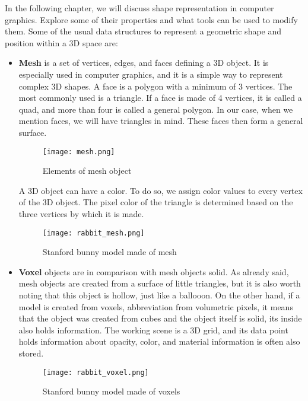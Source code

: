 
In the following chapter, we will discuss shape representation in computer graphics. Explore some of their properties and what tools can be used to modify them. Some of the usual data structures to represent a geometric shape and position within a 3D space are:

\begin{itemize}
    \item \textbf{Mesh} is a set of vertices, edges, and faces defining a 3D object. It is especially used in computer graphics, and it is a simple way to represent complex 3D shapes. A face is a polygon with a minimum of 3 vertices. The most commonly used is a triangle. If a face is made of 4 vertices, it is called a quad, and more than four is called a general polygon. In our case, when we mention faces, we will have triangles in mind. These faces then form a general surface. 
    \begin{figure}[h]
        \centering
        \texttt{[image: mesh.png]}
        \caption{Elements of mesh object \cite{stanford}}
        \label{fig:mesh}
    \end{figure}
    
    A 3D object can have a color. To do so, we assign color values to every vertex of the 3D object. The pixel color of the triangle is determined based on the three vertices by which it is made.
    
    \begin{figure}[h]
        \centering
        \texttt{[image: rabbit\_mesh.png]}
        \caption{Stanford bunny model made of mesh \cite{stanford}}
        \label{fig:rabbit_mesh}
    \end{figure} 

    \item \textbf{Voxel} objects are in comparison with mesh objects solid. As already said, mesh objects are created from a surface of little triangles, but it is also worth noting that this object is hollow, just like a ballooon. On the other hand, if a model is created from voxels, abbreviation from volumetric pixels, it means that the object was created from cubes and the object itself is solid, its inside also holds information. The working scene is a 3D grid, and its data point holds information about opacity, color, and material information is often also stored.
    
    \begin{figure}[h]
        \centering
        \texttt{[image: rabbit\_voxel.png]}
        \caption{Stanford bunny model made of voxels \cite{lstmcell_img}}
        \label{fig:rabbit_voxel}
    \end{figure}


\end{itemize}
